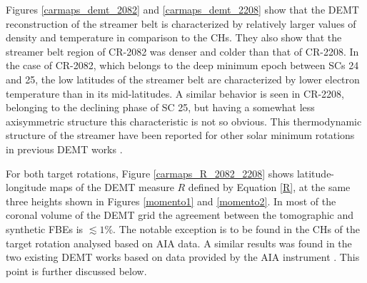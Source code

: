 \documentclass[namedreferences]{solarphysics}
\begin{document}
\begin{article}
{{Figures \ref{carmaps_demt_2082} and \ref{carmaps_demt_2208} show that} the DEMT reconstruction of the streamer belt is characterized by relatively larger values of density and temperature in comparison to the CHs. They also show that the streamer belt region of CR-2082 was denser and colder than  that of CR-2208.} In the case of CR-2082, which belongs to the deep minimum epoch between {SCs 24 and 25}, the {low latitudes of the streamer belt are characterized by lower electron temperature than in its mid-latitudes.} A similar behavior is seen in CR-2208, belonging to the declining phase of {SC 25, but having a {somewhat less axisymmetric} structure this characteristic is not so obvious. This thermodynamic structure} of the streamer have been reported for other solar minimum rotations in previous DEMT works \citep{lloveras_2017,nuevo_2013,vasquez_2010}.

{For both target rotations, Figure \ref{carmaps_R_2082_2208} shows {latitude-longitude} maps of {the DEMT} measure $R$ defined by Equation \ref{R}, at the same three heights shown in Figures \ref{momento1} and \ref{momento2}. In most of the coronal volume of the DEMT grid the agreement between the tomographic and synthetic FBEs is $\lesssim 1\%$. The notable exception is to be found in the CHs of the target rotation {analysed} based on AIA data. A similar results was found in the two existing DEMT works based on data provided by the AIA instrument \citep{nuevo_2015,maccormack_2017}. This point is further discussed below.}


\end{article}
\end{document}
